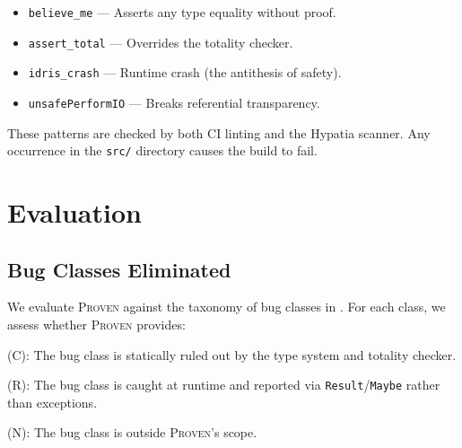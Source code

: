 \documentclass[11pt,a4paper]{article}
\newcommand{\proven}{\textsc{Proven}}
\newcommand{\code}[1]{\texttt{#1}}
\begin{document}
\begin{itemize}[nosep]
  \item \code{believe\_me} --- Asserts any type equality without proof.
  \item \code{assert\_total} --- Overrides the totality checker.
  \item \code{idris\_crash} --- Runtime crash (the antithesis of safety).
  \item \code{unsafePerformIO} --- Breaks referential transparency.
\end{itemize}

These patterns are checked by both CI linting and the Hypatia scanner.
Any occurrence in the \code{src/} directory causes the build to fail.


\section{Evaluation}
\label{sec:evaluation}

\subsection{Bug Classes Eliminated}

We evaluate \proven{} against the taxonomy of bug classes in
. For each class, we assess whether \proven{}
provides:

\begin{description}[nosep]
  \item[Compile-time prevention] (C): The bug class is statically ruled
    out by the type system and totality checker.
  \item[Runtime detection] (R): The bug class is caught at runtime and
    reported via \code{Result}/\code{Maybe} rather than exceptions.
  \item[Not addressed] (N): The bug class is outside \proven{}'s scope.
\end{description}
\end{document}
